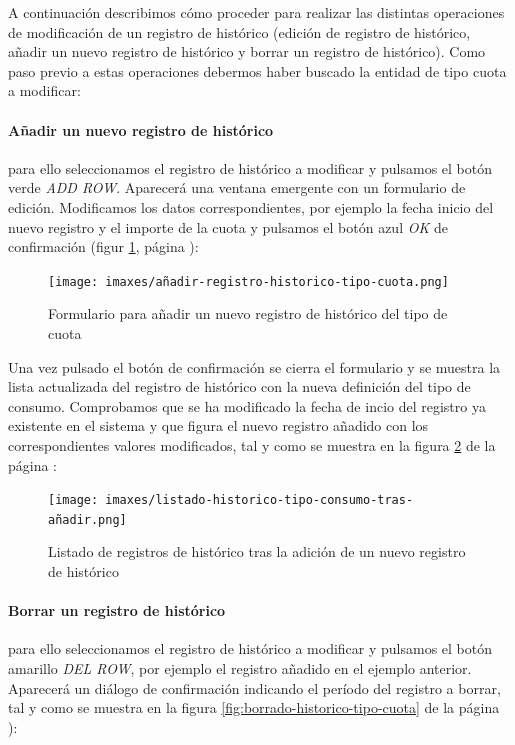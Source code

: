 A continuación describimos cómo proceder para realizar las distintas operaciones de modificación de un registro de histórico (edición de registro de histórico, añadir un nuevo registro de histórico y borrar un registro de histórico). Como paso previo a estas operaciones debermos haber buscado la entidad de tipo cuota a modificar:


\paragraph{Añadir un nuevo registro de histórico} para ello seleccionamos el registro de histórico a modificar y pulsamos el botón verde \emph{ADD ROW}. Aparecerá una ventana emergente con un formulario de edición. Modificamos los datos correspondientes, por ejemplo la fecha inicio del nuevo registro y el importe de la cuota y pulsamos el botón azul \emph{OK} de confirmación (figur \ref{fig:añadir-registro-historico-tipo-cuota}, página \pageref{fig:añadir-registro-historico-tipo-cuota}):

\begin{figure}[H]
  \centering
  \texttt{[image: imaxes/añadir-registro-historico-tipo-cuota.png]}
  \caption{Formulario para añadir un nuevo registro de histórico del tipo de cuota}
  \label{fig:añadir-registro-historico-tipo-cuota}
\end{figure}


Una vez pulsado el botón de confirmación se cierra el formulario y se muestra la lista actualizada del registro de histórico con la nueva definición del tipo de consumo. Comprobamos que se ha modificado la fecha de incio del registro ya existente en el sistema y que figura el nuevo registro añadido con los correspondientes valores modificados, tal y como se muestra en la figura \ref{fig:listado-historico-tipo-consumo-tras-añadir} de la página \pageref{fig:listado-historico-tipo-consumo-tras-añadir}:

\begin{figure}[H]
  \centering
  \texttt{[image: imaxes/listado-historico-tipo-consumo-tras-añadir.png]}
  \caption{Listado de registros de histórico tras la adición de un nuevo registro de histórico}
  \label{fig:listado-historico-tipo-consumo-tras-añadir}
\end{figure}


\paragraph{Borrar un registro de histórico} para ello seleccionamos el registro de histórico a modificar y pulsamos el botón amarillo \emph{DEL ROW}, por ejemplo el registro añadido en el ejemplo anterior. Aparecerá un diálogo de confirmación indicando el período del registro a borrar, tal y como se muestra en la figura \ref{fig:borrado-historico-tipo-cuota} de la página \pageref{fig:borrado-historico-tipo-cuota}):


